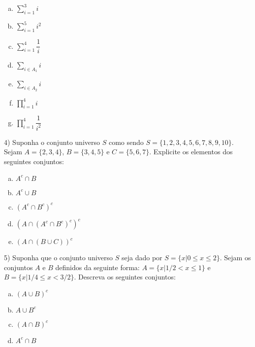 \documentclass{article}
\begin{document}
\begin{enumerate}[a)] %
    \item $\sum\limits_{i = 1}^3 i$ \\
    \item $\sum\limits_{i = 1}^5 i^2$ \\
    \item $\sum\limits_{i = 1}^4 \dfrac{1}{i}$ \\
    \item $\sum\limits_{i \in A_1} i$ \\
    \item $\sum\limits_{i \in A_2} i$ \\
    \item $\prod\limits_{i=1}^4 i$
    \item $\prod\limits_{i=1}^4 \dfrac{1}{i^2}$
\end{enumerate}
\vspace{10px}

4) Suponha o conjunto universo $S$ como sendo $S= \{1,2,3,4,5,6,7,8,9,10\}$. Sejam $A=\{2,3,4\}$, $B=\{3,4,5\}$ e $C=\{5,6,7\}$. Explicite os elementos dos seguintes conjuntos:

\begin{enumerate}[a)] %
    \item $A^c \cap B$
    \item $A^c \cup B$
    \item $(A^c \cap B^c)^c$
    \item $(A \cap (A^c \cap B^c)^c)^c$
    \item $(A \cap (B \cup C))^c$
\end{enumerate}
\vspace{10px}

5) Suponha que o conjunto universo $S$ seja dado por $S=\{x | 0 \leq x \leq 2\}$. Sejam os conjuntos $A$ e $B$ definidos da seguinte forma: $A = \{x| 1/2 < x \leq 1\}$ e $B=\{x|1/4 \leq x < 3/2\}$. Descreva os seguintes conjuntos:

\begin{enumerate}[a)] %
    \item $(A \cup B)^c$
    \item $A \cup B^c$
    \item $(A \cap B)^c$
    \item $A^c \cap B$
\end{enumerate}

\vspace{10px}
\end{document}
